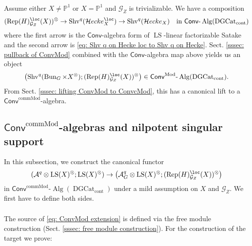 \documentclass[10pt]{amsart}
\newcommand{\sssec}{\subsubsection}
\theoremstyle{remark}
\newcommand{\te}{\text}
\newcommand{\pjl}{\mathbb{P}^1}
\newcommand{\on}{\operatorname}
\newcommand{\cA}{\mathcal{A}}
\newcommand{\cG}{\mathcal{G}}
\newcommand{\DGcat}{\on{DGCat}_{\on{cont}}}
\newcommand{\lAlg}{\text{-}\on{Alg}}
\newcommand{\Rep}{\on{Rep}}
\newcommand{\Shv}{\on{Shv}}
\newcommand{\LS}{\on{LS}}
\newcommand{\Bun}{\on{Bun}}
\newcommand{\Conv}{\mathsf{Conv}}
\newcommand{\ConvMod}{\mathsf{Conv}^{\on{Mod}}}
\newcommand{\ConvcMod}{\mathsf{Conv}^{\on{commMod}}}
\newcommand{\cHecke}{\mathcal{H}ecke}
\begin{document}
\sssec{}
Assume either $X\ne\pjl$ or $X=\pjl$ and $\cG_Z$ is trivializable.
We have a composition
\[(\Rep(H)^{\loc}_{\cG_Z}(X))^{\otimes}\rightarrow \Shv^q(\cHecke^{\loc}_X)\rightarrow \Shv^q(\cHecke_X) \quad \te{in }\Conv\lAlg(\DGcat)\]
where the first arrow is the $\Conv$-algebra form of $\LS$-linear factorizable Satake and the second arrow is \eqref{eq: Shv q on Hecke loc to Shv q on Hecke}. Sect. \ref{sssec: pullback of ConvMod} combined with the $\Conv$-algebra map above yields us an object
\begin{equation}\label{eq: Shv linear Satake kernel ConvMod}
    \left(\Shv^q(\Bun_G\times X^\otimes);(\Rep(H)^{\loc}_{\cG_Z}(X))^{\otimes}\right)\in \ConvMod\lAlg(\DGcat).
\end{equation}
From Sect. \ref{sssec: lifting ConvMod to ConvcMod}, this has a canonical lift to a $\ConvcMod$-algebra.


\subsection{$\ConvcMod$-algebras and nilpotent singular support}\label{ssec: ConvMod algebras and Nilp}
In this subsection, we construct the canonical functor
\begin{equation}\label{eq: ConvMod extension}
    (\cA^q\otimes \LS(X)^{\otimes};\LS(X)^{\otimes})\rightarrow \left(\cA^q_G\otimes \LS(X)^{\otimes}; (\Rep(H)^{\loc}_{\cG_Z}(X))^{\otimes}\right)
\end{equation}
in $\ConvcMod\lAlg(\DGcat)$ under a mild assumption on $X$ and $\cG_Z$. We first have to define both sides.

\sssec{}
The source of \eqref{eq: ConvMod extension} is defined via the free module construction (Sect. \ref{sssec: free module construction}). For the construction of the target we prove:
\end{document}
